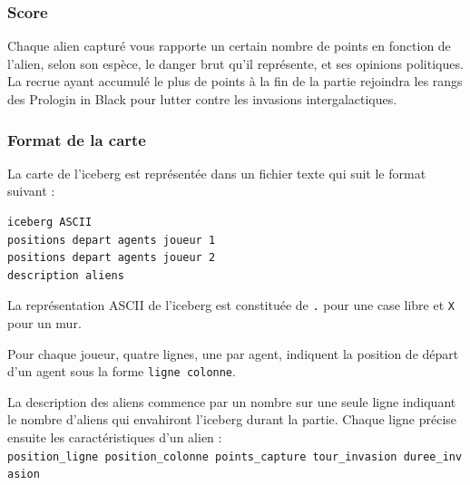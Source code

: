 \subsubsection{Score}\label{score}

Chaque alien capturé vous rapporte un certain nombre de points en
fonction de l'alien, selon son espèce, le danger brut qu'il représente,
et ses opinions politiques. La recrue ayant accumulé le plus de points à
la fin de la partie rejoindra les rangs des Prologin in Black pour
lutter contre les invasions intergalactiques.

\subsubsection{Format de la carte}\label{format-de-la-carte}

La carte de l'iceberg est représentée dans un fichier texte qui suit le
format suivant :

\begin{verbatim}
iceberg ASCII
positions depart agents joueur 1
positions depart agents joueur 2
description aliens
\end{verbatim}

La représentation ASCII de l'iceberg est constituée de \texttt{.} pour
une case libre et \texttt{X} pour un mur.

Pour chaque joueur, quatre lignes, une par agent, indiquent la position
de départ d'un agent sous la forme \texttt{ligne\ colonne}.

La description des aliens commence par un nombre sur une seule ligne
indiquant le nombre d'aliens qui envahiront l'iceberg durant la partie.
Chaque ligne précise ensuite les caractéristiques d'un alien :
\texttt{position\_ligne\ position\_colonne\ points\_capture\ tour\_invasion\ duree\_invasion}

